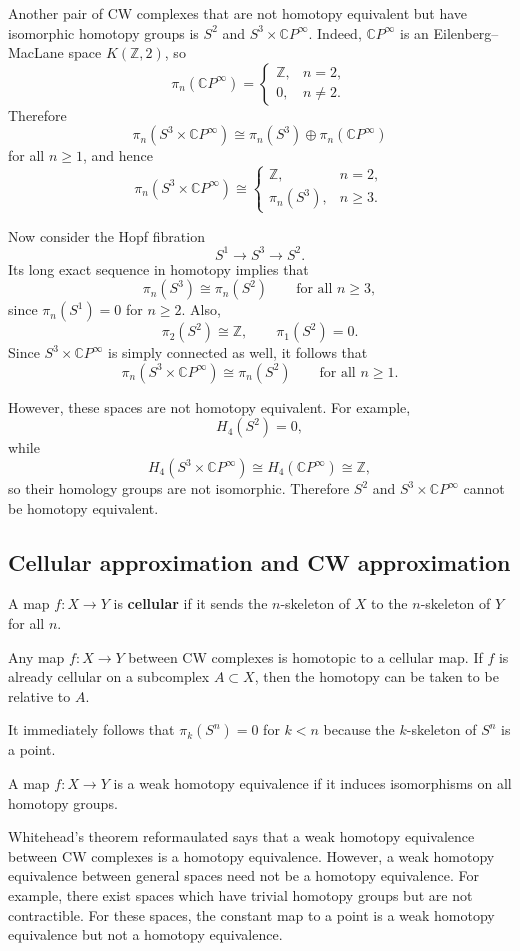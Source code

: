\documentclass[12pt]{article}
\begin{document}
\begin{example}
Another pair of CW complexes that are not homotopy equivalent but have isomorphic homotopy groups is \(S^2\) and \(S^3\times \mathbb{C}P^\infty\). Indeed, \(\mathbb{C}P^\infty\) is an Eilenberg--MacLane space \(K(\mathbb{Z},2)\), so
\[
\pi_n(\mathbb{C}P^\infty)=
\begin{cases}
\mathbb{Z}, & n=2,\\
0, & n\neq 2.
\end{cases}
\]
Therefore
\[
\pi_n(S^3\times \mathbb{C}P^\infty)
\cong
\pi_n(S^3)\oplus \pi_n(\mathbb{C}P^\infty)
\]
for all \(n\ge 1\), and hence
\[
\pi_n(S^3\times \mathbb{C}P^\infty)\cong
\begin{cases}
\mathbb{Z}, & n=2,\\
\pi_n(S^3), & n\ge 3.
\end{cases}
\]

Now consider the Hopf fibration
\[
S^1 \longrightarrow S^3 \longrightarrow S^2.
\]
Its long exact sequence in homotopy implies that
\[
\pi_n(S^3)\cong \pi_n(S^2)
\qquad\text{for all } n\ge 3,
\]
since \(\pi_n(S^1)=0\) for \(n\ge 2\). Also,
\[
\pi_2(S^2)\cong \mathbb{Z},
\qquad
\pi_1(S^2)=0.
\]
Since \(S^3\times \mathbb{C}P^\infty\) is simply connected as well, it follows that
\[
\pi_n(S^3\times \mathbb{C}P^\infty)\cong \pi_n(S^2)
\qquad\text{for all } n\ge 1.
\]

However, these spaces are not homotopy equivalent. For example,
\[
H_4(S^2)=0,
\]
while
\[
H_4(S^3\times \mathbb{C}P^\infty)
\cong
H_4(\mathbb{C}P^\infty)
\cong
\mathbb{Z},
\]
so their homology groups are not isomorphic. Therefore \(S^2\) and \(S^3\times \mathbb{C}P^\infty\) cannot be homotopy equivalent.
\end{example}

\subsection{Cellular approximation and CW approximation}
A map $f: X \to Y$ is \textbf{cellular} if it sends the $n$-skeleton of $X$ to the $n$-skeleton of $Y$ for all $n$. \begin{theorem}
    Any map $f:X\to Y$ between CW complexes is homotopic to a cellular map. If $f$ is already cellular on a subcomplex $A\subset X$, then the homotopy can be taken to be relative to $A$.
\end{theorem}
It immediately follows that $\pi_k(S^n) = 0$ for $k < n$ because the $k$-skeleton of $S^n$ is a point.

\begin{definition}
    A map $f: X \to Y$ is a weak homotopy equivalence if it induces isomorphisms on all homotopy groups. 
\end{definition}
Whitehead's theorem reformaulated says that a weak homotopy equivalence between CW complexes is a homotopy equivalence. However, a weak homotopy equivalence between general spaces need not be a homotopy equivalence. For example, there exist spaces which have trivial homotopy groups but are not contractible. For these spaces, the constant map to a point is a weak homotopy equivalence but not a homotopy equivalence.
\end{document}
